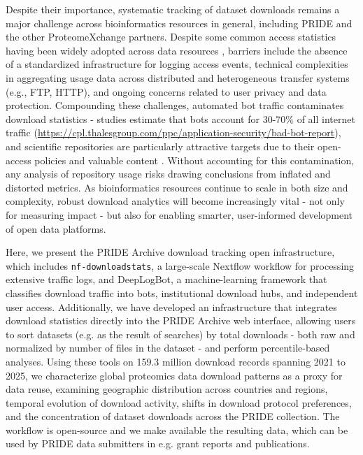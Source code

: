 \documentclass[11pt,a4paper]{article}
\begin{document}
Despite their importance, systematic tracking of dataset downloads remains a major challenge across bioinformatics resources in general, including PRIDE and the other ProteomeXchange partners. Despite some common access statistics having been widely adopted across data resources \citep{Perez2019}, barriers include the absence of a standardized infrastructure for logging access events, technical complexities in aggregating usage data across distributed and heterogeneous transfer systems (e.g., FTP, HTTP), and ongoing concerns related to user privacy and data protection. Compounding these challenges, automated bot traffic contaminates download statistics - studies estimate that bots account for 30-70\% of all internet traffic (\url{https://cpl.thalesgroup.com/ppc/application-security/bad-bot-report}), and scientific repositories are particularly attractive targets due to their open-access policies and valuable content \citep{Orr2025}. Without accounting for this contamination, any analysis of repository usage risks drawing conclusions from inflated and distorted metrics. As bioinformatics resources continue to scale in both size and complexity, robust download analytics will become increasingly vital - not only for measuring impact - but also for enabling smarter, user-informed development of open data platforms.

\begin{sloppypar}
Here, we present the PRIDE Archive download tracking open infrastructure, which includes \texttt{nf-downloadstats}, a large-scale Nextflow \citep{DiTommaso2017} workflow for processing extensive traffic logs, and DeepLogBot, a machine-learning framework that classifies download traffic into bots, institutional download hubs, and independent user access. Additionally, we have developed an infrastructure that integrates download statistics directly into the PRIDE Archive web interface, allowing users to sort datasets (e.g. as the result of searches) by total downloads - both raw and normalized by number of files in the dataset - and perform percentile-based analyses. Using these tools on 159.3 million download records spanning 2021 to 2025, we characterize global proteomics data download patterns as a proxy for data reuse, examining geographic distribution across countries and regions, temporal evolution of download activity, shifts in download protocol preferences, and the concentration of dataset downloads across the PRIDE collection. The workflow is open-source and we make available the resulting data, which can be used by PRIDE data submitters in e.g. grant reports and publications.
\end{sloppypar}
\end{document}
